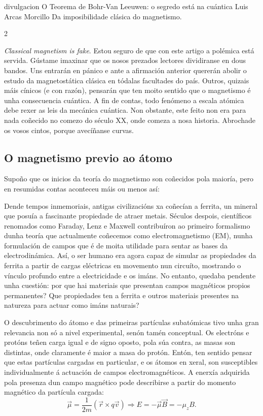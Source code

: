 \Titular%
{divulgacion}%
{O Teorema de Bohr-Van Leeuwen: o segredo está na cuántica}%
{Luis Arcas Morcillo}%
{Da imposibilidade clásica do magnetismo.}%


\begin{multicols}{2}


\textit{Classical magnetism is fake}. Estou seguro de que con este artigo a
polémica está servida. Gústame imaxinar que os nosos prezados lectores
dividiranse en dous bandos. Uns entrarán en pánico e ante a afirmación anterior
quererán abolir o estudo da magnetostática clásica en tódalas facultades do
país. Outros, quizais máis cínicos (e con razón), pensarán que ten moito
sentido que o magnetismo é unha consecuencia cuántica. A fin de contas, todo
fenómeno a escala atómica debe rexer as leis da mecánica cuántica. Non
obstante, este feito non era para nada coñecido no comezo do século XX, onde
comeza a nosa historia. Abrochade os vosos cintos, porque avecíñanse curvas.

\subsection*{O magnetismo previo ao átomo}

Supoño que os inicios da teoría do magnetismo son coñecidos pola maioría, pero
en resumidas contas aconteceu máis ou menos así:

Dende tempos inmemoriais, antigas civilizacións xa coñecían a ferrita, un
mineral que posuía a fascinante propiedade de atraer metais. Séculos despois,
científicos renomados como Faraday, Lenz e Maxwell contribuíron ao primeiro
formalismo dunha teoría que actualmente coñecemos como electromagnetismo (EM),
nunha formulación de campos que é de moita utilidade para sentar as bases da
electrodinámica. Así, o ser humano era agora capaz de simular as propiedades da
ferrita a partir de cargas eléctricas en movemento nun circuíto, mostrando o
vínculo profundo entre a electricidade e os imáns. No entanto, quedaba pendente
unha cuestión: por que hai materiais que presentan campos magnéticos propios
permanentes? Que propiedades ten a ferrita e outros materiais presentes na
natureza para actuar como imáns naturais?

O descubrimento do átomo e das primeiras partículas subatómicas tivo unha
gran relevancia non só a nivel experimental, senón tamén conceptual. Os
electróns e protóns teñen carga igual e de signo oposto, pola súa contra, as
masas son distintas, onde claramente é maior a masa do protón. Entón, ten
sentido pensar que estas partículas cargadas en particular, e os átomos en
xeral, son susceptibles individualmente á actuación de campos
electromagnéticos. A enerxía adquirida pola presenza dun campo magnético pode
describirse a partir do momento magnético da partícula cargada:
\begin{equation}\label{ec.: energia_momento}
    \vec \mu = \frac{1}{2m}(\vec r\times q\vec v)\Longrightarrow E =
    -\vec \mu\vec B = -\mu_zB.
\end{equation}


\end{multicols}

